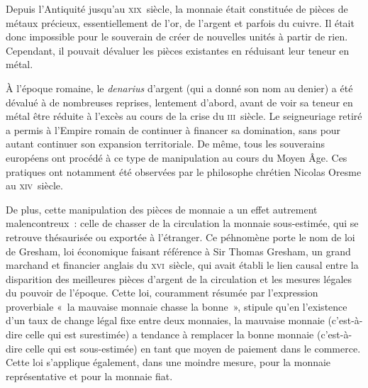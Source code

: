 
Depuis l'Antiquité jusqu'au \textsc{xix}\ieme{}~siècle, la monnaie était constituée de pièces de métaux précieux, essentiellement de l'or, de l'argent et parfois du cuivre. Il était donc impossible pour le souverain de créer de nouvelles unités à partir de rien. Cependant, il pouvait dévaluer les pièces existantes en réduisant leur teneur en métal.

À l'époque romaine, le \emph{denarius} d'argent (qui a donné son nom au denier) a été dévalué à de nombreuses reprises, lentement d'abord, avant de voir sa teneur en métal être réduite à l'excès au cours de la crise du \textsc{iii}\ieme{}~siècle. Le seigneuriage retiré a permis à l'Empire romain de continuer à financer sa domination, sans pour autant continuer son expansion territoriale. De même, tous les souverains européens ont procédé à ce type de manipulation au cours du Moyen Âge. Ces pratiques ont notamment été observées par le philosophe chrétien Nicolas Oresme au \textsc{xiv}\ieme{}~siècle. %

De plus, cette manipulation des pièces de monnaie a un effet autrement malencontreux~: celle de chasser de la circulation la monnaie sous-estimée, qui se retrouve thésaurisée ou exportée à l'étranger. Ce péhnomène porte le nom de loi de Gresham, loi économique faisant référence à Sir Thomas Gresham, un grand marchand et financier anglais du \textsc{xvi}\ieme{}~siècle, qui avait établi le lien causal entre la disparition des meilleures pièces d'argent de la circulation et les mesures légales du pouvoir de l'époque. Cette loi, couramment résumée par l'expression proverbiale «~la mauvaise monnaie chasse la bonne~», stipule qu'en l'existence d'un taux de change légal fixe entre deux monnaies, la mauvaise monnaie (c'est-à-dire celle qui est surestimée) a tendance à remplacer la bonne monnaie (c'est-à-dire celle qui est sous-estimée) en tant que moyen de paiement dans le commerce. Cette loi s'applique également, dans une moindre mesure, pour la monnaie représentative et pour la monnaie fiat.

